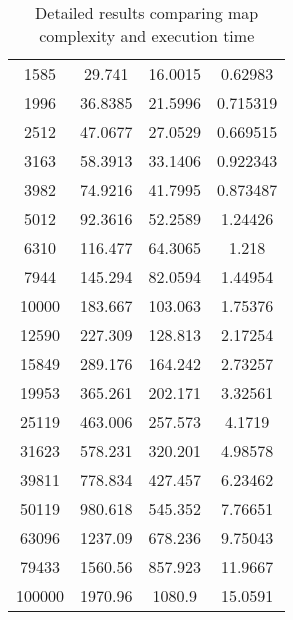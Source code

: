 \begin{table}[ht]
{\begin{tabular}{| c | c c c |}
        1585 & 29.741   & 16.0015  & 0.62983 \\
        1996 & 36.8385  & 21.5996  & 0.715319 \\
        2512 & 47.0677  & 27.0529  & 0.669515 \\
        3163 &  58.3913 &  33.1406 & 0.922343 \\
        3982 &  74.9216 &  41.7995 & 0.873487 \\
        5012 &  92.3616 &  52.2589 & 1.24426 \\ 
        6310 & 116.477  &  64.3065 & 1.218 \\
        7944 & 145.294  &  82.0594 & 1.44954 \\
        10000 & 183.667  & 103.063  & 1.75376 \\
        12590 & 227.309  & 128.813  & 2.17254 \\
        15849 & 289.176  & 164.242  & 2.73257 \\
        19953 & 365.261  & 202.171  & 3.32561 \\
        25119 & 463.006  & 257.573  & 4.1719 \\
        31623 &  578.231 &  320.201 &  4.98578 \\
        39811 &  778.834 &  427.457 &  6.23462 \\
        50119 &  980.618 &  545.352 &  7.76651 \\
        63096 & 1237.09  &  678.236 &  9.75043 \\
        79433 & 1560.56  &  857.923 & 11.9667 \\
        100000 & 1970.96  & 1080.9   & 15.0591 \\
        \hline
        \end{tabular}
    }
    \caption{Detailed results comparing map complexity and execution time}
    \label{tb:steps}
\end{table}

